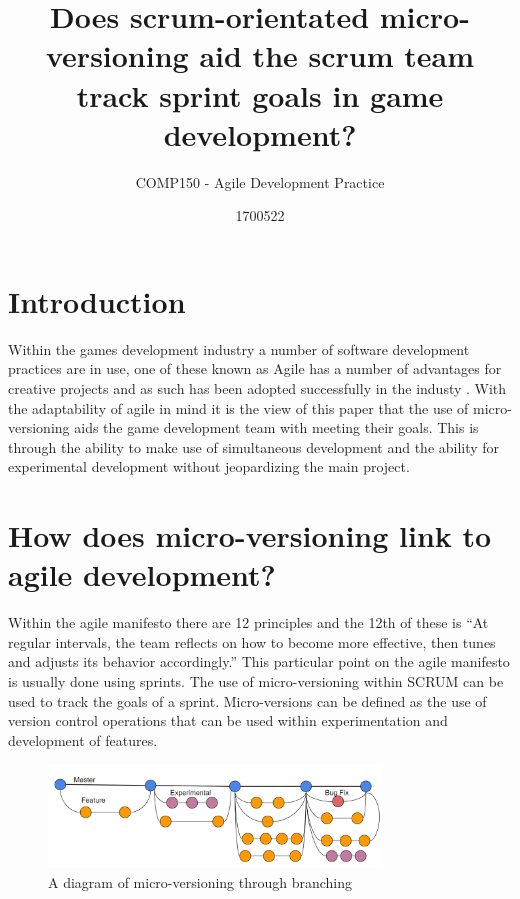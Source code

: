 \documentclass{scrartcl}
\title{Does scrum-orientated micro-versioning aid the scrum team track sprint goals in game development?}
\subtitle{COMP150 - Agile Development Practice}
\author{1700522}
\begin{document}
\maketitle


\section{Introduction}
Within the games development industry a number of software development practices are in use, one of these known as Agile has a number of advantages for creative projects and as such has been adopted successfully in the industy \cite{AgileGameDevelopmentCKeith}. With the adaptability of agile in mind it is the view of this paper that the use of micro-versioning aids the game development team with meeting their goals. This is through the ability to make use of simultaneous development and the ability for experimental development without jeopardizing the main project.

\section{How does micro-versioning link to agile development?}
Within the agile manifesto there are 12 principles and the 12th of these is ``At regular intervals, the team reflects on how 
to become more effective, then tunes and adjusts 
its behavior accordingly.''\cite{AgileManifesto} This particular point on the agile manifesto is usually done using sprints\cite{AdoptingScrum}. The use of micro-versioning within SCRUM can be used to track the goals of a sprint. Micro-versions can be defined as the use of version control operations that can be used within experimentation and development of features\cite{mikami2017micro}.

\begin{figure}[h!]
	\begin{center}
	\includegraphics [width=0.79\textwidth,inner]{Micro-VersioningExampleDiagram}
	\caption{A diagram of micro-versioning through branching}
	\label{MicroVersioningDiagram}
	\end{center}
\end{figure}
\end{document}
